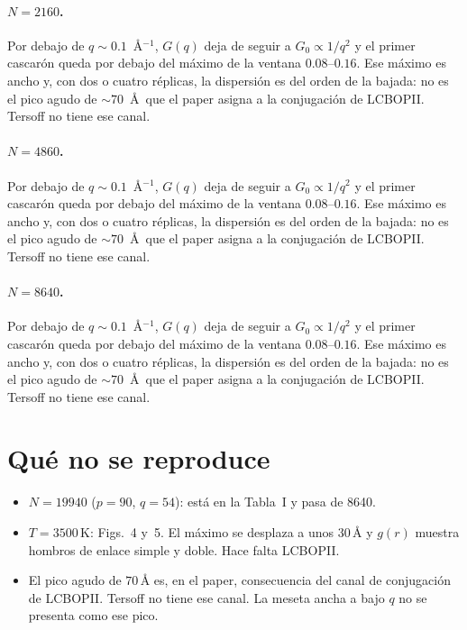 \documentclass[11pt,a4paper]{article}
\begin{document}
\paragraph{$N=2160$.} Por debajo de $q\sim 0.1$~\AA$^{-1}$, $G(q)$ deja de seguir a $G_0\propto 1/q^2$ y el primer cascarón queda por debajo del máximo de la ventana $0.08$--$0.16$. Ese máximo es ancho y, con dos o cuatro réplicas, la dispersión es del orden de la bajada: no es el pico agudo de $\sim 70$~\AA\ que el paper asigna a la conjugación de LCBOPII. Tersoff no tiene ese canal.

\paragraph{$N=4860$.} Por debajo de $q\sim 0.1$~\AA$^{-1}$, $G(q)$ deja de seguir a $G_0\propto 1/q^2$ y el primer cascarón queda por debajo del máximo de la ventana $0.08$--$0.16$. Ese máximo es ancho y, con dos o cuatro réplicas, la dispersión es del orden de la bajada: no es el pico agudo de $\sim 70$~\AA\ que el paper asigna a la conjugación de LCBOPII. Tersoff no tiene ese canal.

\paragraph{$N=8640$.} Por debajo de $q\sim 0.1$~\AA$^{-1}$, $G(q)$ deja de seguir a $G_0\propto 1/q^2$ y el primer cascarón queda por debajo del máximo de la ventana $0.08$--$0.16$. Ese máximo es ancho y, con dos o cuatro réplicas, la dispersión es del orden de la bajada: no es el pico agudo de $\sim 70$~\AA\ que el paper asigna a la conjugación de LCBOPII. Tersoff no tiene ese canal.

\section{Qué no se reproduce}
\begin{itemize}
\item $N=19940$ ($p=90$, $q=54$): está en la Tabla~I y pasa de 8640.
\item $T=3500\,\mathrm{K}$: Figs.~4 y~5. El máximo se desplaza a unos $30\,\text{\AA}$ y $g(r)$ muestra hombros de enlace simple y doble. Hace falta LCBOPII.
\item El pico agudo de $70\,\text{\AA}$ es, en el paper, consecuencia del canal de conjugación de LCBOPII. Tersoff no tiene ese canal. La meseta ancha a bajo $q$ no se presenta como ese pico.
\end{itemize}
\end{document}
